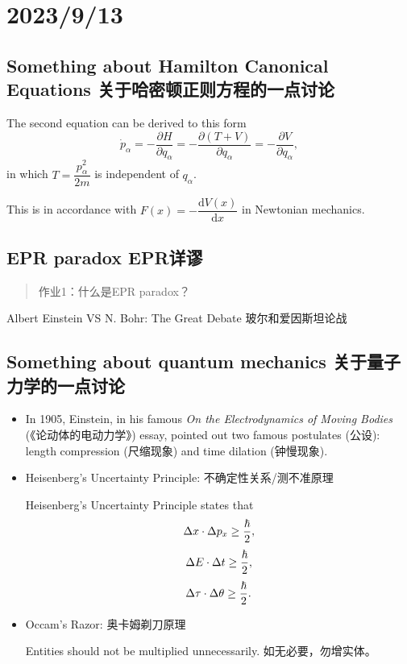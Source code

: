 \chapter{2023/9/13}\label{20230913}

\section{Something about Hamilton Canonical Equations 关于哈密顿正则方程的一点讨论}\label{something-about-hamilton-canonical-equations-ux5173ux4e8eux54c8ux5bc6ux987fux6b63ux5219ux65b9ux7a0bux7684ux4e00ux70b9ux8ba8ux8bba}

The second equation can be derived to this form \[\dot p_\alpha=-\dfrac{\partial H}{\partial q_\alpha}=-\dfrac{\partial (T+V)}{\partial q_\alpha}=-\dfrac{\partial V}{\partial q_\alpha},\] in which \(T=\dfrac{p_\alpha ^2} {2m}\) is independent of \(q_\alpha\).

This is in accordance with \(F(x) = -\dfrac{\mathrm dV(x) }{\mathrm dx}\) in Newtonian mechanics.

\section{EPR paradox EPR详谬}\label{epr-paradox-eprux8be6ux8c2c}

\begin{quote}
作业1：什么是EPR paradox？
\end{quote}

Albert Einstein VS N. Bohr: The Great Debate 玻尔和爱因斯坦论战

\section{Something about quantum mechanics 关于量子力学的一点讨论}\label{something-about-quantum-mechanics-ux5173ux4e8eux91cfux5b50ux529bux5b66ux7684ux4e00ux70b9ux8ba8ux8bba}

\begin{itemize}
\tightlist{}
    
\item
    In 1905, Einstein, in his famous \emph{On the Electrodynamics of Moving Bodies} (《论动体的电动力学》) essay, pointed out two famous postulates (公设): length compression (尺缩现象) and time dilation (钟慢现象).
\item
    Heisenberg's Uncertainty Principle: 不确定性关系/测不准原理

    Heisenberg's Uncertainty Principle states that \[\Delta x \cdot \Delta p_x \geq {\hbar \over 2},\] \[\Delta E \cdot \Delta t \geq {\hbar \over 2},\] \[\Delta \tau \cdot \Delta \theta \geq {\hbar \over 2}.\]
\item
  Occam's Razor: 奥卡姆剃刀原理

  Entities should not be multiplied unnecessarily. 如无必要，勿增实体。
\end{itemize}


